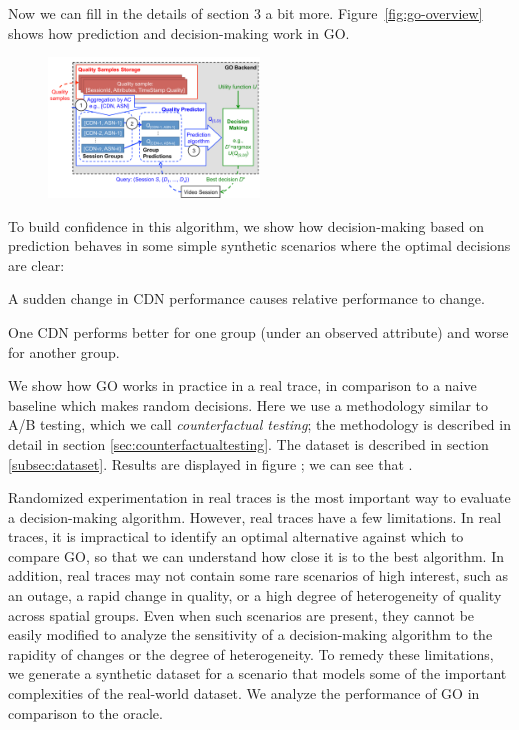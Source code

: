 \label{improvement}
Now we can fill in the details of section 3 a bit more.  Figure~\ref{fig:go-overview} shows how prediction and decision-making work in GO.



\begin{figure}[h!]
\centering
 \includegraphics[width=0.5\textwidth] {figures/backend.pdf}
\label{fig:backend}
\end{figure}

To build confidence in this algorithm, we show how decision-making based on prediction behaves in some simple synthetic scenarios where the optimal decisions are clear:
\begin{packedenumerate}
  \item A sudden change in CDN performance causes relative performance to change.
  \item One CDN performs better for one group (under an observed attribute) and worse for another group.
\end{packedenumerate}
\fillme

We show how GO works in practice in a real trace, in comparison to a naive baseline which makes random decisions.  Here we use a methodology similar to A/B testing, which we call {\it counterfactual testing}; the methodology is described in detail in section \ref{sec:counterfactualtesting}.  The dataset is described in section \ref{subsec:dataset}.  Results are displayed in figure \fillme; we can see that \fillme.

Randomized experimentation in real traces is the most important way to evaluate a decision-making algorithm.  However, real traces have a few limitations.  In real traces, it is impractical to identify an optimal alternative against which to compare GO, so that we can understand how close it is to the best algorithm.  In addition, real traces may not contain some rare scenarios of high interest, such as an outage, a rapid change in quality, or a high degree of heterogeneity of quality across spatial groups.  Even when such scenarios are present, they cannot be easily modified to analyze the sensitivity of a decision-making algorithm to the rapidity of changes or the degree of heterogeneity.  To remedy these limitations, we generate a synthetic dataset for a scenario that models some of the important complexities of the real-world dataset.  We analyze the performance of GO in comparison to the oracle.

